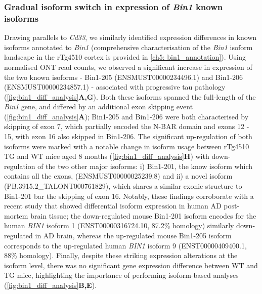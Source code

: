 \subsubsection{Gradual isoform switch in expression of \textit{Bin1} known isoforms}
\label{bin1_diff}
Drawing parallels to \textit{Cd33}, we similarly identified expression differences in known isoforms annotated to \textit{Bin1} (comprehensive characterisation of the \textit{Bin1} isoform landscape in the rTg4510 cortex is provided in \cref{ch5: bin1_annotation}). Using normalised ONT read counts, we observed a significant increase in expression of the two known isoforms - Bin1-205 (ENSMUST00000234496.1) and Bin1-206 (ENSMUST00000234857.1) - associated with progressive tau pathology (\cref{fig:bin1_diff_analysis}\textbf{A,G}). Both these isoforms spanned the full-length of the \textit{Bin1} gene, and differed by an additional exon skipping event (\cref{fig:bin1_diff_analysis}\textbf{A}); Bin1-205 and Bin1-206 were both characterised by skipping of exon 7, which partially encoded the N-BAR domain and exons 12 - 15, with exon 16 also skipped in Bin1-206. The significant up-regulation of both isoforms were marked with a notable change in isoform usage between rTg4510 TG and WT mice aged 8 months (\cref{fig:bin1_diff_analysis}\textbf{H}) with down-regulation of the two other major isoforms: i) Bin1-201, the know isoform which contains all the exons, (ENSMUST00000025239.8) and ii) a novel isoform (PB.3915.2\_TALONT000761829), which shares a similar exonic structure to Bin1-201 bar the skipping of exon 16. Notably, these findings corroborate with a recent study that showed differential isoform expression in human AD post-mortem brain tissue\cite{Taga2020}; the down-regulated mouse Bin1-201 isoform encodes for the human \textit{BIN1} isoform 1 (ENST00000316724.10, 87.2\% homology) similarly down-regulated in AD brain, whereas the up-regulated mouse Bin1-205 isoform corresponds to the up-regulated human \textit{BIN1} isoform 9 (ENST00000409400.1, 88\% homology). Finally, despite these striking expression alterations at the isoform level, there was no significant gene expression difference between WT and TG mice, highlighting the importance of performing isoform-based analyses (\cref{fig:bin1_diff_analysis}\textbf{B,E}). 


